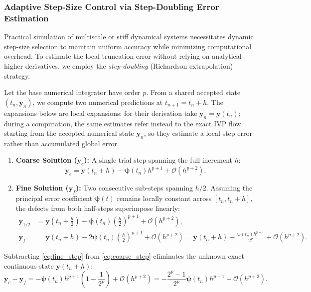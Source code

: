 \documentclass[11pt,a4paper]{article}
\theoremstyle{definition}
\theoremstyle{remark}
\begin{document}
\subsubsection{Adaptive Step-Size Control via Step-Doubling Error Estimation}
Practical simulation of multiscale or stiff dynamical systems necessitates dynamic step-size selection to maintain uniform accuracy while minimizing computational overhead. To estimate the local truncation error without relying on analytical higher derivatives, we employ the \emph{step-doubling} (Richardson extrapolation) strategy.

Let the base numerical integrator have order $p$. From a shared accepted state $(t_n, \mathbf{y}_n)$, we compute two numerical predictions at $t_{n+1} = t_n + h$. The expansions below are local expansions: for their derivation take $\mathbf y_n=\mathbf y(t_n)$; during a computation, the same estimates refer instead to the exact IVP flow starting from the accepted numerical state $\mathbf y_n$, so they estimate a local step error rather than accumulated global error.
\begin{enumerate}
    \item \textbf{Coarse Solution ($\mathbf{y}_c$):} A single trial step spanning the full increment $h$:
    \begin{equation}
    \label{eq:coarse_step}
    \mathbf{y}_c = \mathbf{y}(t_n + h) - \boldsymbol{\psi}(t_n) h^{p+1} + \mathcal{O}(h^{p+2}).
    \end{equation}
    \item \textbf{Fine Solution ($\mathbf{y}_f$):} Two consecutive sub-steps spanning $h/2$. Assuming the principal error coefficient $\boldsymbol{\psi}(t)$ remains locally constant across $[t_n, t_n + h]$, the defects from both half-steps superimpose linearly:
    \begin{align}
    \mathbf{y}_{1/2} &= \mathbf{y}\left(t_n + \frac{h}{2}\right) - \boldsymbol{\psi}(t_n) \left(\frac{h}{2}\right)^{p+1} + \mathcal{O}(h^{p+2}), \label{eq:fine_half_step} \\
    \mathbf{y}_f &= \mathbf{y}(t_n + h) - 2 \boldsymbol{\psi}(t_n) \left(\frac{h}{2}\right)^{p+1} + \mathcal{O}(h^{p+2}) = \mathbf{y}(t_n + h) - \frac{\boldsymbol{\psi}(t_n) h^{p+1}}{2^p} + \mathcal{O}(h^{p+2}). \label{eq:fine_step}
    \end{align}
\end{enumerate}
Subtracting \eqref{eq:fine_step} from \eqref{eq:coarse_step} eliminates the unknown exact continuous state $\mathbf{y}(t_n + h)$:
\begin{equation}
\label{eq:richardson_subtraction}
\mathbf{y}_c - \mathbf{y}_f = -\boldsymbol{\psi}(t_n) h^{p+1} \left(1 - \frac{1}{2^p}\right) + \mathcal{O}(h^{p+2}) = -\frac{2^p - 1}{2^p} \boldsymbol{\psi}(t_n) h^{p+1} + \mathcal{O}(h^{p+2}).
\end{equation}
\end{document}
